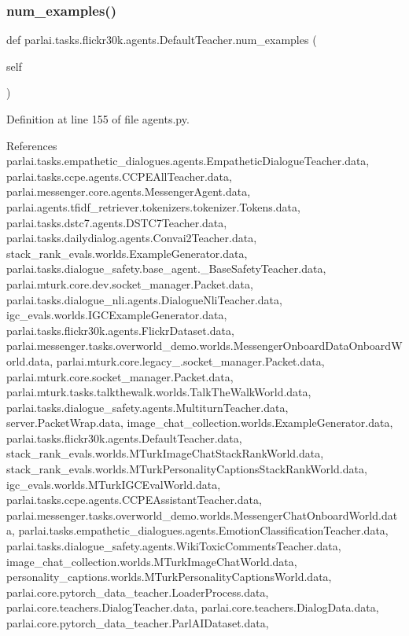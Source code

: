 \subsubsection{\texorpdfstring{num\+\_\+examples()}{num\_examples()}}
{\footnotesize\ttfamily def parlai.\+tasks.\+flickr30k.\+agents.\+Default\+Teacher.\+num\+\_\+examples (\begin{DoxyParamCaption}\item[{}]{self }\end{DoxyParamCaption})}



Definition at line 155 of file agents.\+py.



References parlai.\+tasks.\+empathetic\+\_\+dialogues.\+agents.\+Empathetic\+Dialogue\+Teacher.\+data, parlai.\+tasks.\+ccpe.\+agents.\+C\+C\+P\+E\+All\+Teacher.\+data, parlai.\+messenger.\+core.\+agents.\+Messenger\+Agent.\+data, parlai.\+agents.\+tfidf\+\_\+retriever.\+tokenizers.\+tokenizer.\+Tokens.\+data, parlai.\+tasks.\+dstc7.\+agents.\+D\+S\+T\+C7\+Teacher.\+data, parlai.\+tasks.\+dailydialog.\+agents.\+Convai2\+Teacher.\+data, stack\+\_\+rank\+\_\+evals.\+worlds.\+Example\+Generator.\+data, parlai.\+tasks.\+dialogue\+\_\+safety.\+base\+\_\+agent.\+\_\+\+Base\+Safety\+Teacher.\+data, parlai.\+mturk.\+core.\+dev.\+socket\+\_\+manager.\+Packet.\+data, parlai.\+tasks.\+dialogue\+\_\+nli.\+agents.\+Dialogue\+Nli\+Teacher.\+data, igc\+\_\+evals.\+worlds.\+I\+G\+C\+Example\+Generator.\+data, parlai.\+tasks.\+flickr30k.\+agents.\+Flickr\+Dataset.\+data, parlai.\+messenger.\+tasks.\+overworld\+\_\+demo.\+worlds.\+Messenger\+Onboard\+Data\+Onboard\+World.\+data, parlai.\+mturk.\+core.\+legacy\+\_.\+socket\+\_\+manager.\+Packet.\+data, parlai.\+mturk.\+core.\+socket\+\_\+manager.\+Packet.\+data, parlai.\+mturk.\+tasks.\+talkthewalk.\+worlds.\+Talk\+The\+Walk\+World.\+data, parlai.\+tasks.\+dialogue\+\_\+safety.\+agents.\+Multiturn\+Teacher.\+data, server.\+Packet\+Wrap.\+data, image\+\_\+chat\+\_\+collection.\+worlds.\+Example\+Generator.\+data, parlai.\+tasks.\+flickr30k.\+agents.\+Default\+Teacher.\+data, stack\+\_\+rank\+\_\+evals.\+worlds.\+M\+Turk\+Image\+Chat\+Stack\+Rank\+World.\+data, stack\+\_\+rank\+\_\+evals.\+worlds.\+M\+Turk\+Personality\+Captions\+Stack\+Rank\+World.\+data, igc\+\_\+evals.\+worlds.\+M\+Turk\+I\+G\+C\+Eval\+World.\+data, parlai.\+tasks.\+ccpe.\+agents.\+C\+C\+P\+E\+Assistant\+Teacher.\+data, parlai.\+messenger.\+tasks.\+overworld\+\_\+demo.\+worlds.\+Messenger\+Chat\+Onboard\+World.\+data, parlai.\+tasks.\+empathetic\+\_\+dialogues.\+agents.\+Emotion\+Classification\+Teacher.\+data, parlai.\+tasks.\+dialogue\+\_\+safety.\+agents.\+Wiki\+Toxic\+Comments\+Teacher.\+data, image\+\_\+chat\+\_\+collection.\+worlds.\+M\+Turk\+Image\+Chat\+World.\+data, personality\+\_\+captions.\+worlds.\+M\+Turk\+Personality\+Captions\+World.\+data, parlai.\+core.\+pytorch\+\_\+data\+\_\+teacher.\+Loader\+Process.\+data, parlai.\+core.\+teachers.\+Dialog\+Teacher.\+data, parlai.\+core.\+teachers.\+Dialog\+Data.\+data, parlai.\+core.\+pytorch\+\_\+data\+\_\+teacher.\+Parl\+A\+I\+Dataset.\+data, 